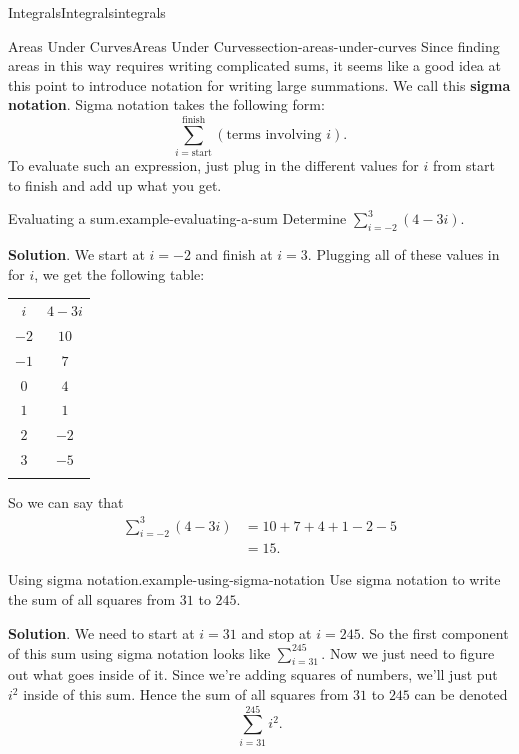 \documentclass[oneside,10pt,]{book}
\newcommand{\terminology}[1]{\textbf{#1}}
\numberwithin{equation}{section}
\newcommand{\hrulethin}  {\noalign{\hrule height 0.04em}}
\newcommand{\hrulethick} {\noalign{\hrule height 0.11em}}
\begin{document}
\begin{chapterptx}{Integrals}{}{Integrals}{}{}{integrals}
\begin{sectionptx}{Areas Under Curves}{}{Areas Under Curves}{}{}{section-areas-under-curves}
\hypertarget{p-410}{}%
Since finding areas in this way requires writing complicated sums, it seems like a good idea at this point to introduce notation for writing large summations. We call this \terminology{sigma notation}. Sigma notation takes the following form:%
\begin{equation*}
\sum_{i=\text{start}}^{\text{finish}}(\text{terms involving }i).
\end{equation*}
To evaluate such an expression, just plug in the different values for \(i\) from start to finish and add up what you get.%
\begin{example}{Evaluating a sum.}{example-evaluating-a-sum}%
\hypertarget{p-411}{}%
Determine \(\sum_{i=-2}^{3}(4-3i).\)%
\par\smallskip%
\noindent\textbf{Solution}.\hypertarget{solution-90}{}\quad%
\hypertarget{p-412}{}%
We start at \(i=-2\) and finish at \(i=3\). Plugging all of these values in for \(i\), we get the following table: \begin{table}
\centering
\begin{tabular}{cc}\hrulethick
\(i\)&\(4-3i\)\tabularnewline\hrulethin
\(-2\)&\(10\)\tabularnewline[0pt]
\(-1\)&\(7\)\tabularnewline[0pt]
\(0\)&\(4\)\tabularnewline[0pt]
\(1\)&\(1\)\tabularnewline[0pt]
\(2\)&\(-2\)\tabularnewline[0pt]
\(3\)&\(-5\)\tabularnewline\hrulethick
\end{tabular}
\end{table}
 So we can say that%
\begin{align*}
\sum_{i=-2}^{3}(4-3i) & =  10 + 7 + 4 + 1 - 2 - 5\\
& = 15. 
\end{align*}
%
\end{example}
\begin{example}{Using sigma notation.}{example-using-sigma-notation}%
\hypertarget{p-413}{}%
Use sigma notation to write the sum of all squares from \(31\) to \(245\).%
\par\smallskip%
\noindent\textbf{Solution}.\hypertarget{solution-91}{}\quad%
\hypertarget{p-414}{}%
We need to start at \(i=31\) and stop at \(i=245\). So the first component of this sum using sigma notation looks like \(\sum_{i=31}^{245}\). Now we just need to figure out what goes inside of it. Since we're adding squares of numbers, we'll just put \(i^{2}\) inside of this sum. Hence the sum of all squares from \(31\) to \(245\) can be denoted%
\begin{equation*}
\sum_{i=31}^{245}i^{2}.
\end{equation*}
%
\end{example}

\end{sectionptx}
\end{chapterptx}
\end{document}
